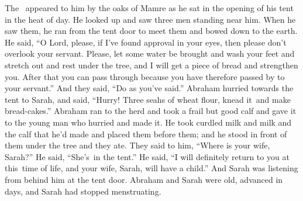 
\begin{inparaenum}
   The \lord\ appeared to him by the oaks of Mamre as he sat in the opening of his tent in the heat of day.%
   He looked up and saw three men standing near him. When he saw them, he ran from the tent door to meet them and bowed down to the earth.%
   He said, ``O Lord, please, if I've found approval in your eyes, then please don't overlook your servant.%
   Please, let some water be brought and wash your feet and stretch out and rest under the tree,%
   and I will get a piece of bread and strengthen you. After that you can pass through because you have therefore passed by to your servant.'' And they said, ``Do as you've said.''%
   Abraham hurried towards the tent to Sarah, and said, ``Hurry! Three seahs of wheat flour, knead it\understood\ and make bread-cakes.''%
   Abraham ran to the herd and took a frail but good calf and gave it to the young man who hurried and made it.%
   He took curdled milk and milk and the calf that he'd made and placed them before them; and he stood in front of them under the tree and they ate.%
   They said to him, ``Where is your wife, Sarah?'' He said, ``She's\understood\ in the tent.''%
   He said, ``I will definitely return to you at this\understood\ time of life, and your wife, Sarah, will have a child.'' And Sarah was listening from behind him at the tent door.%
   Abraham and Sarah were old, advanced in days, and Sarah had stopped menstruating.%

\end{inparaenum}
